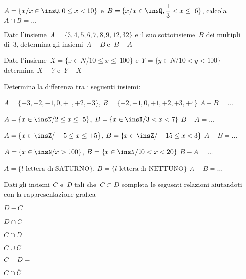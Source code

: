 \begin{esercizio}
\label{ese:7.51}
\(A=\{x/x\in \insQ,0\le x<10\}\) e~\(B=\{x/x\in \insQ,\dfrac{1}{3}<x\le~6\}\), 
calcola~\(A\cap B=\ldots\)
\end{esercizio}

\begin{esercizio}
\label{ese:7.52}
Dato l'insieme~\(A=\{3, 4, 5, 6, 7, 8, 9, 12, 32\}\) e il suo sottoinsieme~\(B\) dei 
multipli di~3, determina gli
insiemi~\(A-B\) e~\(B-A\)
\end{esercizio}

\begin{esercizio}
\label{ese:7.53}
Dato l'insieme~\(X=\{x\in N/10\le x\le~100\}\) e~\(Y=\{y\in N/10<y<100\}\) 
determina~\(X-Y\) e~\(Y-X\)
\end{esercizio}

\begin{esercizio}
\label{ese:7.54}
Determina la differenza tra i seguenti insiemi:
\vspace{-6pt}
\begin{enumeratea}
 \item \(A=\{-3,-2,-1,0,+1,+2,+3\}\), \(B=\{-2,-1,0,+1,+2,+3,+4\}\) \(A-B=\ldots\)
\item \(A=\{x\in\insN/2\le x\le~5\}\), \(B=\{x\in\insN/3<x<7\}\) \(B-A=\ldots\)
\item \(A=\{x\in\insZ/-5\le x\le +5\}\), \(B=\{x\in\insZ/-15\le x<3\}\) \(A-B=\ldots\)
\item \(A=\{x\in\insN/x>100\}\), \(B=\{x\in \insN/10<x<20\}\) \(B-A=\ldots\)
\item \(A=\{l\text{ lettera di SATURNO}\}\), \(B=\{l\text{ lettera di NETTUNO}\}\) 
\(A-B=\ldots\)
\end{enumeratea}
\end{esercizio}

\begin{esercizio}
\label{ese:7.55}
Dati gli insiemi~\(C\) e~\(D\) tali che~\(C\subset D\)
completa le seguenti relazioni aiutandoti con la rappresentazione
grafica
\vspace{-6pt}
\begin{multicols}{3}
\begin{enumeratea}
\item \(D-C=\)
\item \(D\cap \overline{C}=\)
\item \(\overline{{C\cap D}}=\)
\item \(C\cup \overline{C}=\)
\item \(C-D=\)
\item \(C\cap \overline{C}=\)
\end{enumeratea}
\end{multicols}
\end{esercizio}

